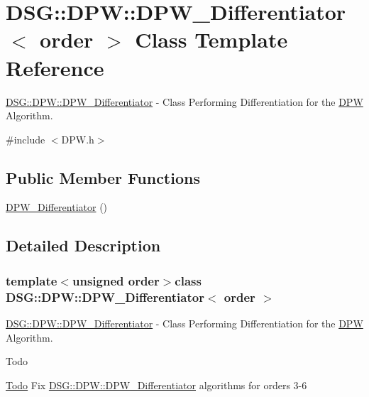 \hypertarget{class_d_s_g_1_1_d_p_w_1_1_d_p_w___differentiator}{\section{D\+S\+G\+:\+:D\+P\+W\+:\+:D\+P\+W\+\_\+\+Differentiator$<$ order $>$ Class Template Reference}
\label{class_d_s_g_1_1_d_p_w_1_1_d_p_w___differentiator}
}


\hyperlink{class_d_s_g_1_1_d_p_w_1_1_d_p_w___differentiator}{D\+S\+G\+::\+D\+P\+W\+::\+D\+P\+W\+\_\+\+Differentiator} -\/ Class Performing Differentiation for the \hyperlink{namespace_d_s_g_1_1_d_p_w}{D\+P\+W} Algorithm.  




{\ttfamily \#include $<$D\+P\+W.\+h$>$}

\subsection*{Public Member Functions}
\begin{DoxyCompactItemize}
\item 
\hyperlink{class_d_s_g_1_1_d_p_w_1_1_d_p_w___differentiator_acff6769e1c7555fea5e74f1e15bdecd9}{D\+P\+W\+\_\+\+Differentiator} ()
\end{DoxyCompactItemize}


\subsection{Detailed Description}
\subsubsection*{template$<$unsigned order$>$class D\+S\+G\+::\+D\+P\+W\+::\+D\+P\+W\+\_\+\+Differentiator$<$ order $>$}

\hyperlink{class_d_s_g_1_1_d_p_w_1_1_d_p_w___differentiator}{D\+S\+G\+::\+D\+P\+W\+::\+D\+P\+W\+\_\+\+Differentiator} -\/ Class Performing Differentiation for the \hyperlink{namespace_d_s_g_1_1_d_p_w}{D\+P\+W} Algorithm. 

\begin{DoxyRefDesc}{Todo}
\item[\hyperlink{todo__todo000005}{Todo}]Fix \hyperlink{class_d_s_g_1_1_d_p_w_1_1_d_p_w___differentiator}{D\+S\+G\+::\+D\+P\+W\+::\+D\+P\+W\+\_\+\+Differentiator} algorithms for orders 3-\/6 \end{DoxyRefDesc}


